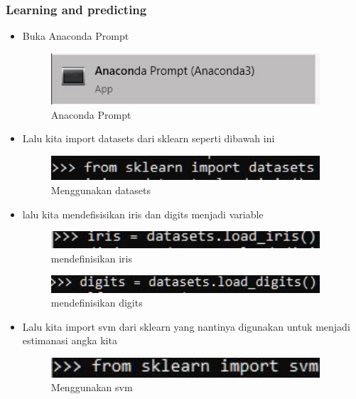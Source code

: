 \subsubsection{Learning and predicting}
\begin{itemize}
\item Buka Anaconda Prompt
\begin{figure}[H]
	\begin{center}
   	 \includegraphics[width=10cm]{figures/1174066/1/anaconda.jpg}
   	 \caption{Anaconda Prompt}	
	\end{center}
\end{figure}

\item Lalu kita import datasets dari sklearn seperti dibawah ini
\begin{figure}[H]
	\begin{center}
   	 \includegraphics[width=10cm]{figures/1174066/1/5.jpg}
   	 \caption{Menggunakan datasets}	
	\end{center}
\end{figure}

\item lalu kita mendefisisikan iris dan digits menjadi variable
\begin{figure}[H]
	\begin{center}
   	 \includegraphics[width=10cm]{figures/1174066/1/6.jpg}
   	 \caption{mendefinisikan iris}	
	\end{center}
\end{figure}
\begin{figure}[H]
	\begin{center}
   	 \includegraphics[width=10cm]{figures/1174066/1/7.jpg}
   	 \caption{mendefinisikan digits}	
	\end{center}
\end{figure}

\item Lalu kita import svm dari sklearn yang nantinya digunakan untuk menjadi estimanasi angka kita
\begin{figure}[H]
	\begin{center}
   	 \includegraphics[width=10cm]{figures/1174066/1/4.jpg}
   	 \caption{Menggunakan svm}	
	\end{center}
\end{figure}


\end{itemize}
